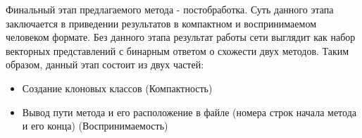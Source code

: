Финальный этап предлагаемого метода - постобработка. Суть данного этапа заключается в приведении результатов в компактном и воспринимаемом человеком формате. Без данного этапа результат работы сети выглядит как набор векторных представлений с бинарным ответом о схожести двух методов. Таким образом, данный этап состоит из двух частей:

\begin{itemize}
\setlength\itemsep{0mm}
\item Создание клоновых классов (Компактность)
\item Вывод пути метода и его расположение в файле (номера строк начала метода и его конца) (Воспринимаемость)
\end{itemize}
